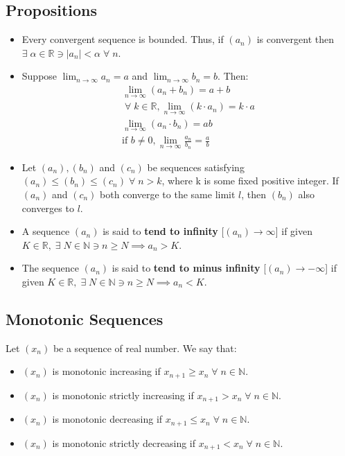 \documentclass[12pt, a4paper]{article}
\newcommand{\ex}{\; \exists \;}
\newcommand{\real}{\mathbb{R}}
\newcommand{\nat}{\mathbb{N}}
\newcommand{\all}{\; \forall \;}
\begin{document}
\subsection{Propositions}
\begin{itemize}
  \item Every convergent sequence is bounded. Thus, if $(a_n)$ is convergent
    then $\exists \; \alpha \in \real \ni |a_n| < \alpha \all n$.

  \item Suppose $\lim_{n \to \infty} a_n = a$ and $\lim_{n \to \infty}
    b_n = b$. Then:
    \begin{gather*}
      \lim_{n \to \infty} (a_n + b_n) = a + b \\[2pt]
      \all k \in \real, \lim_{n \to \infty} (k \cdot a_n) = k \cdot a \\[2pt]
      \lim_{n \to \infty} (a_n \cdot b_n) = ab \\[2pt]
      \text{if } b \ne 0, \lim_{n \to \infty} \frac{a_n}{b_n} = \frac{a}{b} 
    \end{gather*}

  \item Let $(a_n), (b_n)$ and $(c_n)$ be sequences satisfying
    $(a_n) \leq (b_n) \leq (c_n) \all n > k$, where k is some fixed 
    positive integer. If $(a_n)$ and $(c_n)$ both converge to the same
    limit $l$, then $(b_n)$ also converges to $l$.

  \item A sequence $(a_n)$ is said to \textbf{tend to infinity} [$(a_n) \to \infty$]
    if given $K \in \real, \ex N \in \nat \ni n \geq N \implies a_n > K$.

  \item The sequence $(a_n)$ is said to \textbf{tend to minus infinity} 
    [$(a_n) \to -\infty$]
    if given $K \in \real, \ex N \in \nat \ni n \geq N \implies a_n < K$.
\end{itemize}

\subsection{Monotonic Sequences}
Let $(x_n)$ be a sequence of real number. We say that:
\begin{itemize}
  \item $(x_n)$ is monotonic increasing if $x_{n+1} \geq x_n \all n \in \nat$.
  \item $(x_n)$ is monotonic strictly increasing if 
    $x_{n+1} > x_n \all n \in \nat$.
  \item $(x_n)$ is monotonic decreasing if $x_{n+1} \leq x_n \all n \in \nat$.
  \item $(x_n)$ is monotonic strictly decreasing if $x_{n+1} < x_n \all n \in \nat$.
\end{itemize}
\end{document}
